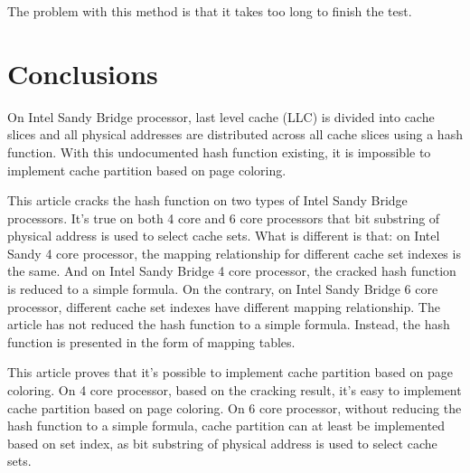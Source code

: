 \documentclass[conference]{IEEEtran}
\begin{document}
The problem with this method is that it takes too long to finish the test. 
\section{Conclusions}
On Intel Sandy Bridge processor, last level cache (LLC) is divided into cache slices and all physical addresses are distributed across all cache slices using a hash function. With this undocumented hash function existing, it is impossible to implement cache partition based on page coloring.

This article cracks the hash function on two types of Intel Sandy Bridge processors. It's true on both 4 core and 6 core processors that bit substring of physical address is used to select cache sets. What is different is that: on Intel Sandy 4 core processor, the mapping relationship for different cache set indexes is the same. And on Intel Sandy Bridge 4 core processor, the cracked hash function is reduced to a simple formula. On the contrary, on Intel Sandy Bridge 6 core processor, different cache set indexes have different mapping relationship. The article has not reduced the hash function to a simple formula. Instead, the hash function is presented in the form of mapping tables.

This article proves that it's possible to implement cache partition based on page coloring. On 4 core processor, based on the cracking result, it's easy to implement cache partition based on page coloring. On 6 core processor, without reducing the hash function to a simple formula, cache partition can at least be implemented based on set index, as bit substring of physical address is used to select cache sets.

































\end{document}
